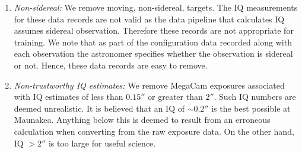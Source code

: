 \begin{enumerate}
    \item \textit{ Non-sidereal:} We remove moving, non-sidereal, targets.   The IQ measurements for these data records are not valid as the data pipeline that calculates IQ assumes sidereal observation.  Therefore these records are not appropriate for training.  We note that as part of the configuration data recorded along with each observation the astronomer specifies whether the observation is sidereal or not. Hence, these data records are easy to remove.
    \item \textit{Non-trustworthy IQ estimates:} We remove MegaCam exposures associated with IQ estimates of less than $0.15''$ or greater than $2''$.  Such  IQ numbers are deemed unrealistic.  It is believed that an IQ of $\sim 0.2''$ is the best possible at Maunakea.  Anything below this is deemed to result from an erroneous calculation when converting from the raw exposure data. On the other hand, IQ $>2''$ is too large for useful  science.

\end{enumerate}
